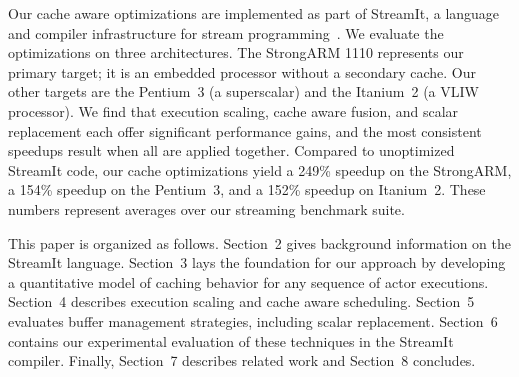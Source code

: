 \documentclass{sigplanconf}
\begin{document}
Our cache aware optimizations are implemented as part of StreamIt, a
language and compiler infrastructure for stream
programming~\cite{streamitcc}.  We evaluate the optimizations on three
architectures.  The StrongARM 1110 represents our primary target; it
is an embedded processor without a secondary cache.  Our other targets
are the Pentium~3 (a superscalar) and the Itanium~2 (a VLIW
processor).  We find that execution scaling, cache aware fusion, and
scalar replacement each offer significant performance gains, and the
most consistent speedups result when all are applied together.
Compared to unoptimized StreamIt code, our cache optimizations yield a
249\% speedup on the StrongARM, a 154\% speedup on the Pentium~3, and
a 152\% speedup on Itanium~2.  These numbers represent averages over
our streaming benchmark suite.

This paper is organized as follows.  Section~2 gives background
information on the StreamIt language.  Section~3 lays the foundation
for our approach by developing a quantitative model of caching
behavior for any sequence of actor executions.  Section~4 describes
execution scaling and cache aware scheduling.  Section~5 evaluates
buffer management strategies, including scalar replacement.  Section~6
contains our experimental evaluation of these techniques in the
StreamIt compiler.  Finally, Section~7 describes related work and
Section~8 concludes.

\end{document}

